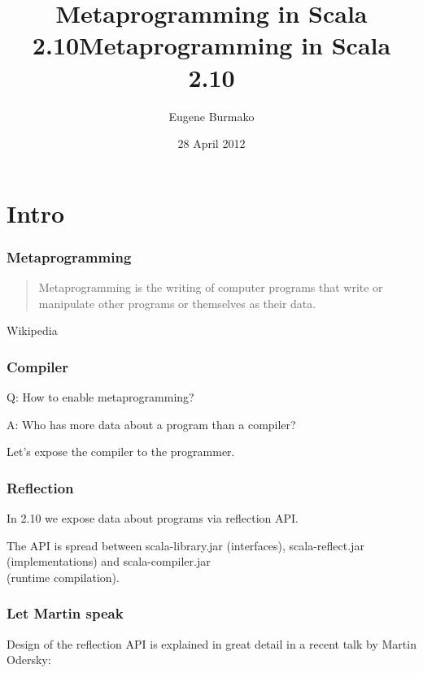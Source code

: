 \documentclass[hyperref={bookmarks=false}]{beamer}
\title{Metaprogramming in Scala 2.10}
\begin{document}
\title{Metaprogramming in Scala 2.10}
\author{Eugene Burmako}
\date{28 April 2012}
\maketitle

\section{Intro}

\begin{frame}[fragile]
\frametitle{Metaprogramming}

\begin{quote}
Metaprogramming is the writing of computer programs that write or manipulate other programs or themselves as their data.
\end{quote}

\begin{flushright}
\textemdash Wikipedia
\end{flushright}

\end{frame}

\begin{frame}[fragile]
\frametitle{Compiler}

Q: How to enable metaprogramming?

A: Who has more data about a program than a compiler?

Let's expose the compiler to the programmer.

\end{frame}

\begin{frame}[fragile]
\frametitle{Reflection}

In 2.10 we expose data about programs via reflection API.

The API is spread between scala-library.jar (interfaces), scala-reflect.jar (implementations) and scala-compiler.jar \\ (runtime compilation).

\end{frame}

\begin{frame}[fragile]
\frametitle{Let Martin speak}

Design of the reflection API is explained in great detail in a recent talk by Martin Odersky:


\end{frame}
\end{document}
